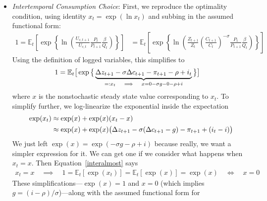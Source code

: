 \documentclass[12pt]{article}
\theoremstyle{plain}
\theoremstyle{definition}
\theoremstyle{remark}
\newcommand{\E}{\mathbb{E}}
\begin{document}
\begin{itemize}
  \item \emph{Intertemporal Consumption Choice}:
    First, we reproduce the optimality condition, using identity
    $x_t=\exp(\ln x_t)$ and subbing in the assumed functional form:
    \begin{align*}
      1 =
      \E_t\left[
        \exp\left\{
        \ln
        \left(
        \frac{U_{c,t+1}}{U_{c,t}}
        \frac{P_t}{P_{t+1}}
        \frac{\beta}{Q_t}
        \right)
        \right\}
      \right]
      &=
      \E_t\left[
        \exp\left\{
        \ln
        \left(
        \frac{Z_{t+1}}{Z_{t}}
        \left(\frac{C_{t+1}}{C_t}\right)^{-\sigma}
        \frac{P_t}{P_{t+1}}
        \frac{\beta}{Q_t}
        \right)
        \right\}
      \right]
    \end{align*}
    Using the definition of logged variables, this simplifies to
    \begin{align}
      1
      =&\;
      \E_t\big[
        \exp\big\{
        \underbrace{%
        \Delta z_{t+1}
        -\sigma \Delta c_{t+1}
        - \pi_{t+1}
        -\rho
        + i_t
        }_{=:x_t\quad\implies\quad x = 0 - \sigma g - 0 - \rho + i}
        \big\}
      \big]
      \label{interalmost}
    \end{align}
    where $x$ is the nonstochastic steady state value corresponding to
    $x_t$. To simplify further, we log-linearize the exponential inside
    the expectation
    \begin{align}
      \exp(x_t)
      &\approx \exp(x) + \exp(x)(x_t-x) \notag \\
      &\approx \exp(x) + \exp(x)\big(
        \Delta z_{t+1}
        -\sigma (\Delta c_{t+1}-g)
        - \pi_{t+1}
        + (i_t-i)
      \big) \label{interalmost2}
    \end{align}
    We just left $\exp(x)=\exp(-\sigma g-\rho+i)$ because really, we
    want a simpler expression for it. We can get one if we consider what
    happens when $x_t=x$. Then Equation~\ref{interalmost} says
    \begin{align*}
      x_t=x\quad\implies\quad
      1 = \E_t[\exp(x_t)] = \E_t[\exp(x)] = \exp(x)
      \quad\iff\quad
      x = 0
    \end{align*}
    These simplifications---$\exp(x)=1$ and $x=0$ (which implies
    $g=(i-\rho)/\sigma$)---along with the assumed functional form for

\end{itemize}
\end{document}
